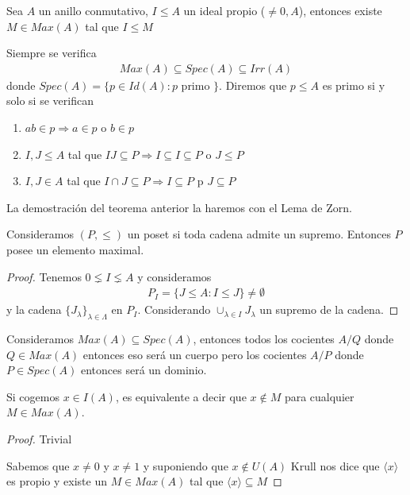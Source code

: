 \begin{teo}
    Sea $A$ un anillo conmutativo, $I\leq A$ un ideal propio ($\neq 0, A$), entonces existe $M\in Max(A)$ tal que $I \leq M$
\end{teo}
Siempre se verifica 
\begin{gather*}
    Max(A) \subseteq Spec(A)  \subseteq Irr(A)
\end{gather*}
donde $Spec(A)=\{p\in Id(A) : p \text{ primo }\}$. Diremos que $p\leq A$ es primo si y solo si se verifican 
\begin{enumerate}
    \item $ab\in p \Rightarrow a\in p$ o $b\in p$
    \item $I,J\leq A$ tal que $IJ \subseteq P \Rightarrow I \subseteq I\subseteq P$ o $J\leq P$
    \item $I,J\in A$ tal que $I\cap J \subseteq P \Rightarrow I \subseteq P$ p $J\subseteq P$
\end{enumerate}

La demostración del teorema anterior la haremos con el Lema de Zorn. 
\begin{lema}
    Consideramos $(P, \leq)$ un poset si toda cadena admite un supremo. Entonces $P$ posee un elemento maximal.
\end{lema}

\begin{proof}
    Tenemos $0\lneq I \lneq A$ y consideramos
    \begin{gather*}
        P_I = \{J \leq A : I \leq J\} \neq \emptyset
    \end{gather*}
    y la cadena $\{J_\lambda\}_{\lambda\in \Lambda}$ en $P_I$.
    Considerando $\cup_{\lambda \in I} J_\lambda$ un supremo de la cadena.
\end{proof}

Consideramos $Max(A)\subseteq Spec(A)$, entonces todos los cocientes $A/Q$ donde $Q\in Max(A)$ entonces eso será un cuerpo pero los cocientes $A/P$ donde $P\in Spec(A)$ entonces será un dominio.

\begin{lema}
    Si cogemos $x\in I(A)$, es equivalente a decir que $x\notin M$ para cualquier $M\in Max(A)$.
    \begin{proof}
        \item[$\Rightarrow$)] Trivial
        \item[$\Leftarrow$)] Sabemos que $x\neq 0$ y $x\neq 1$ y suponiendo que $x\notin U(A)$ Krull nos dice que $\langle x \rangle$ es propio y existe un $M\in Max(A)$ tal que $\langle x \rangle \subseteq M$
    \end{proof}
\end{lema}

